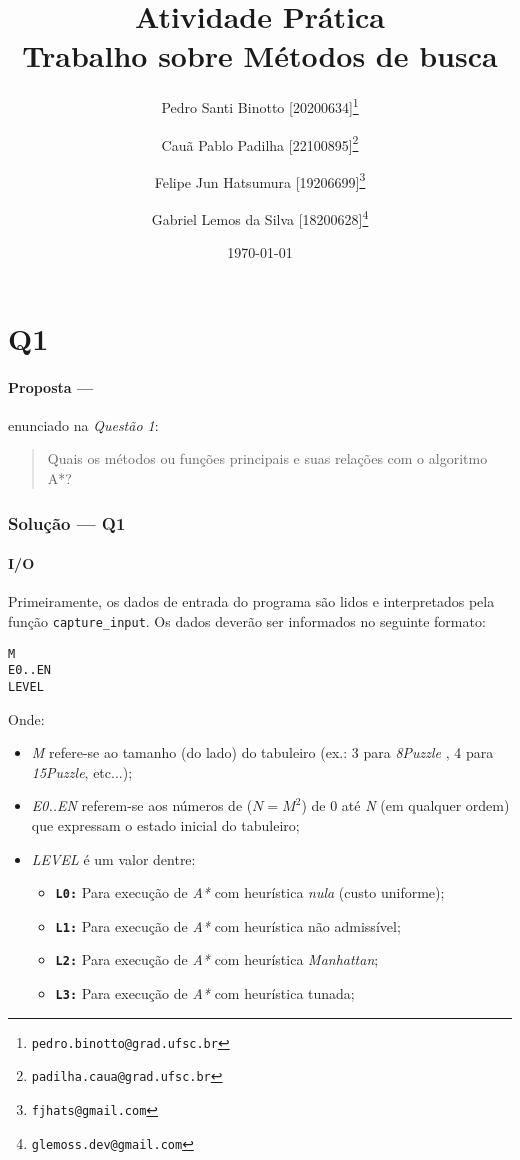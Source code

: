 \documentclass[12pt]{article}
\title{Atividade Prática \RNum{1} \\ [0.2em]\smaller{}Trabalho sobre Métodos de busca}
\author[1]{Pedro Santi Binotto [20200634]\thanks{\texttt{pedro.binotto@grad.ufsc.br}}}
\author[2]{Cauã Pablo Padilha [22100895]\thanks{\texttt{padilha.caua@grad.ufsc.br}}}
\author[3]{Felipe Jun Hatsumura [19206699]\thanks{\texttt{fjhats@gmail.com}}}
\author[4]{Gabriel Lemos da Silva [18200628]\thanks{\texttt{glemoss.dev@gmail.com}}}
\date{\today}
\affil[1]{Departamento de Informática e Estatística, Universidade Federal de Santa Catarina}
\begin{document}
\begin{titlepage}
\maketitle
\thispagestyle{empty}

\end{titlepage}

\tableofcontents

\printglossary[title=Glossário, toctitle=Glossário]

\newpage

\section{Q1}

\paragraph{Proposta ---} enunciado na \textit{Questão 1}:

\begin{quote}
Quais os métodos ou funções principais e suas relações com o algoritmo A*?
\end{quote}

\subsubsection{Solução --- \textbf{Q1}}

\paragraph{I/O}
Primeiramente, os dados de entrada do programa são lidos e interpretados pela função \texttt{capture\_input}. Os dados deverão ser informados no seguinte formato:

\begin{verbatim}
M
E0..EN
LEVEL
\end{verbatim}

Onde:
\begin{itemize}
  \item \textit{M} refere-se ao tamanho (do lado) do tabuleiro (ex.: 3 para \textit{8Puzzle} , 4 para \textit{15Puzzle}, etc...);
\item \textit{E0..EN} referem-se aos números de ($N = M^2$) de 0 até \textit{N} (em qualquer ordem) que expressam o estado inicial do tabuleiro;
\item \textit{LEVEL} é um valor dentre:
  \begin{itemize}
    \item \textbf{\texttt{L0:}} Para execução de \textit{A*} com heurística \textit{nula} (custo uniforme);
      \item \textbf{\texttt{L1:}} Para execução de \textit{A*} com heurística não admissível;
      \item \textbf{\texttt{L2:}} Para execução de \textit{A*} com heurística \textit{Manhattan\cite{sharma2016}};
      \item \textbf{\texttt{L3:}} Para execução de \textit{A*} com heurística tunada;
  \end{itemize}
\end{itemize}
\end{document}
